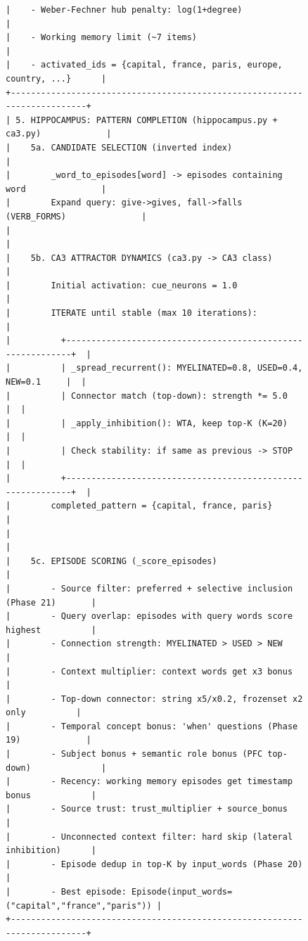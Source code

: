 \documentclass[11pt]{article}
\begin{document}
\begin{figure}[ht]
\begin{Verbatim}[fontsize=\tiny,frame=single]
|    - Weber-Fechner hub penalty: log(1+degree)                            |
|    - Working memory limit (~7 items)                                     |
|    - activated_ids = {capital, france, paris, europe, country, ...}      |
+--------------------------------------------------------------------------+
| 5. HIPPOCAMPUS: PATTERN COMPLETION (hippocampus.py + ca3.py)             |
|    5a. CANDIDATE SELECTION (inverted index)                              |
|        _word_to_episodes[word] -> episodes containing word               |
|        Expand query: give->gives, fall->falls (VERB_FORMS)               |
|                                                                          |
|    5b. CA3 ATTRACTOR DYNAMICS (ca3.py -> CA3 class)                      |
|        Initial activation: cue_neurons = 1.0                             |
|        ITERATE until stable (max 10 iterations):                         |
|          +------------------------------------------------------------+  |
|          | _spread_recurrent(): MYELINATED=0.8, USED=0.4, NEW=0.1     |  |
|          | Connector match (top-down): strength *= 5.0                |  |
|          | _apply_inhibition(): WTA, keep top-K (K=20)                |  |
|          | Check stability: if same as previous -> STOP               |  |
|          +------------------------------------------------------------+  |
|        completed_pattern = {capital, france, paris}                      |
|                                                                          |
|    5c. EPISODE SCORING (_score_episodes)                                 |
|        - Source filter: preferred + selective inclusion (Phase 21)       |
|        - Query overlap: episodes with query words score highest          |
|        - Connection strength: MYELINATED > USED > NEW                    |
|        - Context multiplier: context words get x3 bonus                  |
|        - Top-down connector: string x5/x0.2, frozenset x2 only          |
|        - Temporal concept bonus: 'when' questions (Phase 19)             |
|        - Subject bonus + semantic role bonus (PFC top-down)              |
|        - Recency: working memory episodes get timestamp bonus            |
|        - Source trust: trust_multiplier + source_bonus                   |
|        - Unconnected context filter: hard skip (lateral inhibition)      |
|        - Episode dedup in top-K by input_words (Phase 20)                |
|        - Best episode: Episode(input_words=("capital","france","paris")) |
+--------------------------------------------------------------------------+

\end{Verbatim}
\end{figure}
\end{document}
